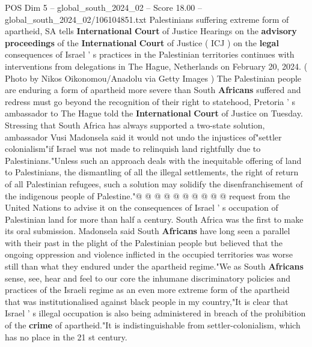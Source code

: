 \begin{textsample}{POS Dim 5 – global\_south\_2024\_02 – Score 18.00 – global\_south\_2024\_02/106104851.txt}  \label{ex:f5_pos_151}
Palestinians suffering extreme form of apartheid, SA tells \textbf{International} \textbf{Court} of Justice Hearings on the \textbf{advisory} \textbf{proceedings} of the \textbf{International} \textbf{Court} of Justice ( ICJ ) on the \textbf{legal} consequences of Israel ' s practices in the Palestinian territories continues with interventions from delegations in The Hague, Netherlands on February 20, 2024. ( Photo by Nikos Oikonomou/Anadolu via Getty Images ) The Palestinian people are enduring a form of apartheid more severe than South \textbf{Africans} suffered and redress must go beyond the recognition of their right to statehood, Pretoria ' s ambassador to The Hague told the \textbf{International} \textbf{Court} of Justice on Tuesday.
Stressing that South Africa has always supported a two-state solution, ambassador Vusi Madonsela said it would not undo the injustices of"settler colonialism"if Israel was not made to relinquish land rightfully due to Palestinians."Unless such an approach deals with the inequitable offering of land to Palestinians, the dismantling of all the illegal settlements, the right of return of all Palestinian refugees, such a solution may solidify the disenfranchisement of the indigenous people of Palestine."@ @ @ @ @ @ @ @ @ @ request from the United Nations to advise it on the consequences of Israel ' s occupation of Palestinian land for more than half a century.
South Africa was the first to make its oral submission.
Madonsela said South \textbf{Africans} have long seen a parallel with their past in the plight of the Palestinian people but believed that the ongoing oppression and violence inflicted in the occupied territories was worse still than what they endured under the apartheid regime."We as South \textbf{Africans} sense, see, hear and feel to our core the inhumane discriminatory policies and practices of the Israeli regime as an even more extreme form of the apartheid that was institutionalised against black people in my country,"It is clear that Israel ' s illegal occupation is also being administered in breach of the prohibition of the \textbf{crime} of apartheid."It is indistinguishable from settler-colonialism, which has no place in the 21 st century.

\end{textsample}
